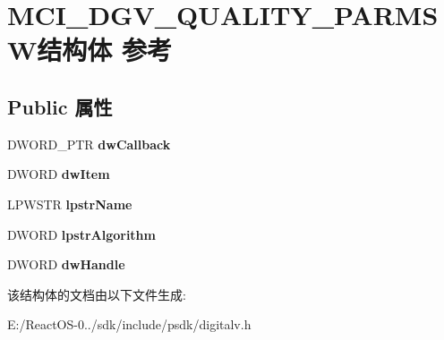 \hypertarget{struct_m_c_i___d_g_v___q_u_a_l_i_t_y___p_a_r_m_s_w}{}\section{M\+C\+I\+\_\+\+D\+G\+V\+\_\+\+Q\+U\+A\+L\+I\+T\+Y\+\_\+\+P\+A\+R\+M\+S\+W结构体 参考}
\label{struct_m_c_i___d_g_v___q_u_a_l_i_t_y___p_a_r_m_s_w}
\subsection*{Public 属性}
\begin{DoxyCompactItemize}
\item 
\mbox{\label{struct_m_c_i___d_g_v___q_u_a_l_i_t_y___p_a_r_m_s_w_a6ecab19d469711dceef26c8b39d830b6}} 
D\+W\+O\+R\+D\+\_\+\+P\+TR {\bfseries dw\+Callback}
\item 
\mbox{\label{struct_m_c_i___d_g_v___q_u_a_l_i_t_y___p_a_r_m_s_w_a2f1a4ffa6ea81e010bb2a1decfac239d}} 
D\+W\+O\+RD {\bfseries dw\+Item}
\item 
\mbox{\label{struct_m_c_i___d_g_v___q_u_a_l_i_t_y___p_a_r_m_s_w_aff7ff1b5862383f02fc68cefb234c694}} 
L\+P\+W\+S\+TR {\bfseries lpstr\+Name}
\item 
\mbox{\label{struct_m_c_i___d_g_v___q_u_a_l_i_t_y___p_a_r_m_s_w_a13e8cb188b09852e93ed15dade991677}} 
D\+W\+O\+RD {\bfseries lpstr\+Algorithm}
\item 
\mbox{\label{struct_m_c_i___d_g_v___q_u_a_l_i_t_y___p_a_r_m_s_w_aed8eb3b68e75d5ffd38d883542f2ad49}} 
D\+W\+O\+RD {\bfseries dw\+Handle}
\end{DoxyCompactItemize}


该结构体的文档由以下文件生成\+:\begin{DoxyCompactItemize}
\item 
E\+:/\+React\+O\+S-\/0../sdk/include/psdk/digitalv.\+h\end{DoxyCompactItemize}
